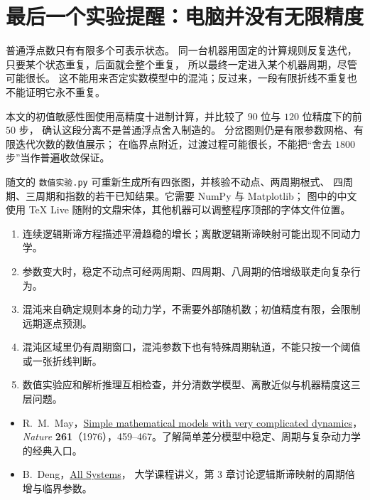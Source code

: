 \documentclass[UTF8,11pt,fontset=none]{ctexart}
\begin{document}
\section{最后一个实验提醒：电脑并没有无限精度}
普通浮点数只有有限多个可表示状态。
同一台机器用固定的计算规则反复迭代，只要某个状态重复，后面就会整个重复，
所以最终一定进入某个机器周期，尽管可能很长。
这不能用来否定实数模型中的混沌；反过来，一段有限折线不重复也不能证明它永不重复。

本文的初值敏感性图使用高精度十进制计算，并比较了 $90$ 位与 $120$ 位精度下的前 $50$ 步，
确认这段分离不是普通浮点舍入制造的。
分岔图则仍是有限参数网格、有限迭代次数的数值展示；
在临界点附近，过渡过程可能很长，不能把“舍去 $1800$ 步”当作普遍收敛保证。

随文的 \texttt{数值实验.py} 可重新生成所有四张图，并核验不动点、两周期根式、
四周期、三周期和指数的若干已知结果。它需要 NumPy 与 Matplotlib；
图中的中文使用 TeX Live 随附的文鼎宋体，其他机器可以调整程序顶部的字体文件位置。

\begin{keybox}[这条路线到底告诉了我们什么]
\begin{enumerate}
\item 连续逻辑斯谛方程描述平滑趋稳的增长；离散逻辑斯谛映射可能出现不同动力学。
\item 参数变大时，稳定不动点可经两周期、四周期、八周期的倍增级联走向复杂行为。
\item 混沌来自确定规则本身的动力学，不需要外部随机数；初值精度有限，会限制远期逐点预测。
\item 混沌区域里仍有周期窗口，混沌参数下也有特殊周期轨道，不能只按一个阈值或一张折线判断。
\item 数值实验应和解析推理互相检查，并分清数学模型、离散近似与机器精度这三层问题。
\end{enumerate}
\end{keybox}

\begin{keybox}[参考与继续阅读]
\begin{itemize}
\item R.~M.~May，\href{https://doi.org/10.1038/261459a0}{Simple mathematical models with very complicated dynamics}，
\textit{Nature} \textbf{261}（1976），459--467。了解简单差分模型中稳定、周期与复杂动力学的经典入口。
\item B.~Deng，\href{https://www.math.unl.edu/~bdeng1/Research/Book\%20Project/PartFour.pdf}{All Systems}，
大学课程讲义，第 3 章讨论逻辑斯谛映射的周期倍增与临界参数。
\end{itemize}
\end{keybox}
\end{document}
